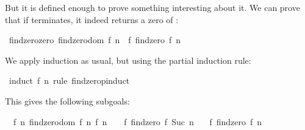 \begin{isabellebody}
\begin{isamarkuptext}
  But it is defined enough to prove something interesting about it. We
  can prove that if 
  terminates, it indeed returns a zero of :%
\end{isamarkuptext}%
\isamarkuptrue%
\isamarkupfalse%
\ findzero{}zero{}\ {}findzero{}dom\ {}f{}\ n{}\ {}\ f\ {}findzero\ f\ n{}\ {}\ {}{}%
\isadelimproof
%
\endisadelimproof
%
\isatagproof
%
\begin{isamarkuptxt}%
\noindent We apply induction as usual, but using the partial induction
  rule:%
\end{isamarkuptxt}%
\isamarkuptrue%
\isamarkupfalse%
\ {}induct\ f\ n\ rule{}\ findzero{}pinduct{}%
\begin{isamarkuptxt}%
\noindent This gives the following subgoals:

  \begin{isabelle}%
\ {}{}\ {}f\ n{}\ {}findzero{}dom\ {}f{}\ n{}{}\ f\ n\ {}\ {}\ {}\ f\ {}findzero\ f\ {}Suc\ n{}{}\ {}\ {}{}\isanewline
{}\ f\ {}findzero\ f\ n{}\ {}\ {}%
\end{isabelle}


\end{isamarkuptxt}
\end{isabellebody}
